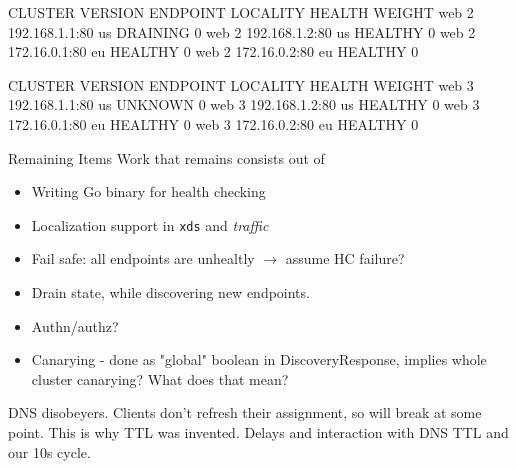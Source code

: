\documentclass[aspectratio=169]{beamer}
\begin{document}
    \begin{frame}[fragile]

        \begin{verbbox}
CLUSTER  VERSION  ENDPOINT        LOCALITY  HEALTH    WEIGHT
web      2        192.168.1.1:80  us        DRAINING  0
web      2        192.168.1.2:80  us        HEALTHY   0
web      2        172.16.0.1:80   eu        HEALTHY   0
web      2        172.16.0.2:80   eu        HEALTHY   0
        \end{verbbox}

    \end{frame}

    \begin{frame}[fragile]

        \begin{verbbox}
CLUSTER  VERSION  ENDPOINT        LOCALITY  HEALTH   WEIGHT
web      3        192.168.1.1:80  us        UNKNOWN  0
web      3        192.168.1.2:80  us        HEALTHY  0
web      3        172.16.0.1:80   eu        HEALTHY  0
web      3        172.16.0.2:80   eu        HEALTHY  0
        \end{verbbox}

    \end{frame}

    \begin{frame}{Remaining Items}
        Work that remains consists out of
        \begin{itemize}
            \item Writing Go binary for health checking
            \item Localization support in \texttt{xds} and \emph{traffic}
            \item Fail safe: all endpoints are unhealtly $\rightarrow$ assume HC failure?
            \item Drain state, while discovering new endpoints.
            \item Authn/authz?
            \item Canarying - done as "global" boolean in DiscoveryResponse, implies whole cluster canarying? What does that mean?
        \end{itemize}

        DNS disobeyers. Clients don't refresh their assignment, so will break at some point.
        This is why TTL was invented.
        Delays and interaction with DNS TTL and our 10s cycle.
    \end{frame}
\end{document}
